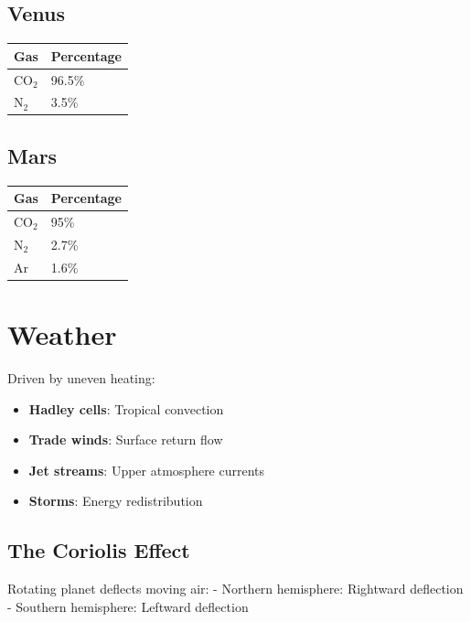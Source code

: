 \documentclass[
  11pt,
  letterpaper,
  twoside,
  openright]{book}
\providecommand{\tightlist}{%
  \setlength{\itemsep}{0pt}\setlength{\parskip}{0pt}}
\begin{document}
\subsection{Venus}\label{venus}

\begin{longtable}[]{@{}ll@{}}
\toprule\noalign{}
Gas & Percentage \\
\midrule\noalign{}
\endhead
\bottomrule\noalign{}
\endlastfoot
\(\text{CO}_2\) & 96.5\% \\
\(\text{N}_2\) & 3.5\% \\
\end{longtable}

\subsection{Mars}\label{mars}

\begin{longtable}[]{@{}ll@{}}
\toprule\noalign{}
Gas & Percentage \\
\midrule\noalign{}
\endhead
\bottomrule\noalign{}
\endlastfoot
\(\text{CO}_2\) & 95\% \\
\(\text{N}_2\) & 2.7\% \\
Ar & 1.6\% \\
\end{longtable}

\section{Weather}\label{weather}

Driven by uneven heating:

\begin{itemize}
\tightlist
\item
  \textbf{Hadley cells}: Tropical convection
\item
  \textbf{Trade winds}: Surface return flow
\item
  \textbf{Jet streams}: Upper atmosphere currents
\item
  \textbf{Storms}: Energy redistribution
\end{itemize}

\subsection{The Coriolis Effect}\label{the-coriolis-effect}

Rotating planet deflects moving air: - Northern hemisphere: Rightward
deflection - Southern hemisphere: Leftward deflection
\end{document}
